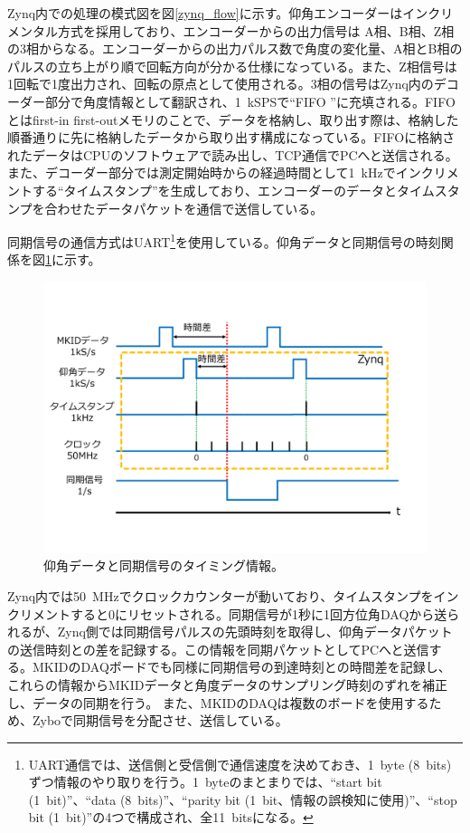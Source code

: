 Zynq内での処理の模式図を図\ref{zynq_flow}に示す。仰角エンコーダーはインクリメンタル方式を採用しており、エンコーダーからの出力信号は A相、B相、Z相の3相からなる。エンコーダーからの出力パルス数で角度の変化量、A相とB相のパルスの立ち上がり順で回転方向が分かる仕様になっている。また、Z相信号は1回転で1度出力され、回転の原点として使用される。3相の信号はZynq内のデコーダー部分で角度情報として翻訳され、\SI{1}{kSPS}で``FIFO \cite{FIFO}''に充填される。FIFOとはfirst-in first-outメモリのことで、データを格納し、取り出す際は、格納した順番通りに先に格納したデータから取り出す構成になっている。FIFOに格納されたデータはCPUのソフトウェアで読み出し、TCP通信でPCへと送信される。また、デコーダー部分では測定開始時からの経過時間として\SI{1}{kHz}でインクリメントする``タイムスタンプ''を生成しており、エンコーダーのデータとタイムスタンプを合わせたデータパケットを通信で送信している。

同期信号の通信方式はUART\footnote{UART通信では、送信側と受信側で通信速度を決めておき、\SI{1}{byte} (\SI{8}{bits})ずつ情報のやり取りを行う。\SI{1}{byte}のまとまりでは、``start bit (\SI{1}{bit})''、``data (\SI{8}{bits})''、``parity bit (\SI{1}{bit}、情報の誤検知に使用)''、``stop bit (\SI{1}{bit})''の4つで構成され、全\SI{11}{bits}になる。}を使用している。仰角データと同期信号の時刻関係を図\ref{synchro_zynq}に示す。
\begin{figure}[htbp]
  \centering
  \includegraphics[width=1.0\columnwidth]{4_elDAQ/figs/sync_zynq2.pdf}
  \caption{仰角データと同期信号のタイミング情報。}
  \label{synchro_zynq}
\end{figure}
Zynq内では\SI{50}{MHz}でクロックカウンターが動いており、タイムスタンプをインクリメントすると0にリセットされる。同期信号が1秒に1回方位角DAQから送られるが、Zynq側では同期信号パルスの先頭時刻を取得し、仰角データパケットの送信時刻との差を記録する。この情報を同期パケットとしてPCへと送信する。MKIDのDAQボードでも同様に同期信号の到達時刻との時間差を記録し、これらの情報からMKIDデータと角度データのサンプリング時刻のずれを補正し、データの同期を行う。
また、MKIDのDAQは複数のボードを使用するため、Zyboで同期信号を分配させ、送信している。

